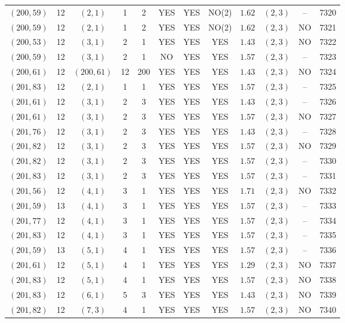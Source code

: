 \begin{longtable}{|c|c|c|c|c|c|c|c|c|c|c|c|}
$(200,59)$ & 12 & $(2,1)$ & 1 & 2 & YES & YES & NO(2) & $1.62$ & $(2,3)$ & -- & 7320\\
$(200,59)$ & 12 & $(2,1)$ & 1 & 2 & YES & YES & NO(2) & $1.62$ & $(2,3)$ & NO & 7321\\
$(200,53)$ & 12 & $(3,1)$ & 2 & 1 & YES & YES & YES & $1.43$ & $(2,3)$ & NO & 7322\\
$(200,59)$ & 12 & $(3,1)$ & 2 & 1 & NO & YES & YES & $1.57$ & $(2,3)$ & -- & 7323\\
$(200,61)$ & 12 & $(200,61)$ & 12 & 200 & YES & YES & YES & $1.43$ & $(2,3)$ & NO & 7324\\
$(201,83)$ & 12 & $(2,1)$ & 1 & 1 & YES & YES & YES & $1.57$ & $(2,3)$ & -- & 7325\\
$(201,61)$ & 12 & $(3,1)$ & 2 & 3 & YES & YES & YES & $1.43$ & $(2,3)$ & -- & 7326\\
$(201,61)$ & 12 & $(3,1)$ & 2 & 3 & YES & YES & YES & $1.57$ & $(2,3)$ & NO & 7327\\
$(201,76)$ & 12 & $(3,1)$ & 2 & 3 & YES & YES & YES & $1.43$ & $(2,3)$ & -- & 7328\\
$(201,82)$ & 12 & $(3,1)$ & 2 & 3 & YES & YES & YES & $1.57$ & $(2,3)$ & NO & 7329\\
$(201,82)$ & 12 & $(3,1)$ & 2 & 3 & YES & YES & YES & $1.57$ & $(2,3)$ & -- & 7330\\
$(201,83)$ & 12 & $(3,1)$ & 2 & 3 & YES & YES & YES & $1.57$ & $(2,3)$ & -- & 7331\\
$(201,56)$ & 12 & $(4,1)$ & 3 & 1 & YES & YES & YES & $1.71$ & $(2,3)$ & NO & 7332\\
$(201,59)$ & 13 & $(4,1)$ & 3 & 1 & YES & YES & YES & $1.57$ & $(2,3)$ & -- & 7333\\
$(201,77)$ & 12 & $(4,1)$ & 3 & 1 & YES & YES & YES & $1.57$ & $(2,3)$ & -- & 7334\\
$(201,83)$ & 12 & $(4,1)$ & 3 & 1 & YES & YES & YES & $1.57$ & $(2,3)$ & -- & 7335\\
$(201,59)$ & 13 & $(5,1)$ & 4 & 1 & YES & YES & YES & $1.57$ & $(2,3)$ & -- & 7336\\
$(201,61)$ & 12 & $(5,1)$ & 4 & 1 & YES & YES & YES & $1.29$ & $(2,3)$ & NO & 7337\\
$(201,83)$ & 12 & $(5,1)$ & 4 & 1 & YES & YES & YES & $1.57$ & $(2,3)$ & NO & 7338\\
$(201,83)$ & 12 & $(6,1)$ & 5 & 3 & YES & YES & YES & $1.43$ & $(2,3)$ & NO & 7339\\
$(201,82)$ & 12 & $(7,3)$ & 4 & 1 & YES & YES & YES & $1.57$ & $(2,3)$ & NO & 7340\\

\end{longtable}
